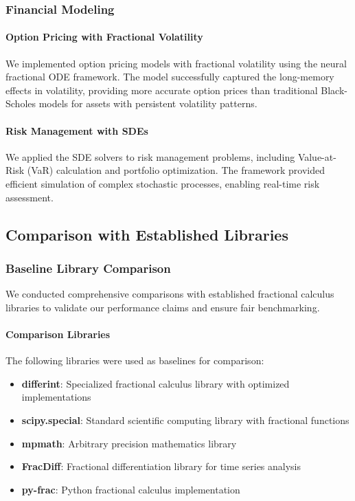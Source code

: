 \subsubsection{Financial Modeling}

\paragraph{Option Pricing with Fractional Volatility}
We implemented option pricing models with fractional volatility using the neural fractional ODE framework. The model successfully captured the long-memory effects in volatility, providing more accurate option prices than traditional Black-Scholes models for assets with persistent volatility patterns.

\paragraph{Risk Management with SDEs}
We applied the SDE solvers to risk management problems, including Value-at-Risk (VaR) calculation and portfolio optimization. The framework provided efficient simulation of complex stochastic processes, enabling real-time risk assessment.

\subsection{Comparison with Established Libraries}

\subsubsection{Baseline Library Comparison}

We conducted comprehensive comparisons with established fractional calculus libraries to validate our performance claims and ensure fair benchmarking.

\paragraph{Comparison Libraries}

The following libraries were used as baselines for comparison:
\begin{itemize}
\item \textbf{differint}: Specialized fractional calculus library with optimized implementations
\item \textbf{scipy.special}: Standard scientific computing library with fractional functions
\item \textbf{mpmath}: Arbitrary precision mathematics library
\item \textbf{FracDiff}: Fractional differentiation library for time series analysis
\item \textbf{py-frac}: Python fractional calculus implementation
\end{itemize}


